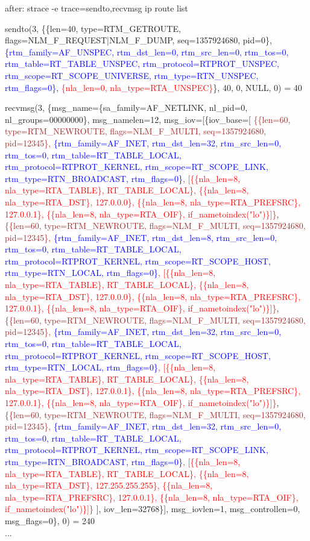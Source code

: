 \documentclass[unicode,aspectratio=169]{beamer}
\begin{document}
\begin{frame}[fragile]{\small after: strace -e trace=sendto,recvmsg ip route list}

{\texttt\tiny
\fontsize{4pt}{4pt}\selectfont
sendto(3, \{\{len=40, type=RTM\_GETROUTE, flags=NLM\_F\_REQUEST|NLM\_F\_DUMP, seq=1357924680, pid=0\},
 \textcolor{blue}{\{rtm\_family=AF\_UNSPEC, rtm\_dst\_len=0, rtm\_src\_len=0, rtm\_tos=0, rtm\_table=RT\_TABLE\_UNSPEC, rtm\_protocol=RTPROT\_UNSPEC, rtm\_scope=RT\_SCOPE\_UNIVERSE, rtm\_type=RTN\_UNSPEC, rtm\_flags=0\}},
  \textcolor{red}{\{nla\_len=0, nla\_type=RTA\_UNSPEC\}}\}, 40, 0, NULL, 0) = 40

\medskip

recvmsg(3, \{msg\_name=\{sa\_family=AF\_NETLINK, nl\_pid=0, nl\_groups=00000000\}, msg\_namelen=12, msg\_iov=[\{iov\_base=[
\textcolor{brown}{\{\{len=60, type=RTM\_NEWROUTE, flags=NLM\_F\_MULTI, seq=1357924680, pid=12345\},
 \textcolor{blue}{\{rtm\_family=AF\_INET, rtm\_dst\_len=32, rtm\_src\_len=0, rtm\_tos=0, rtm\_table=RT\_TABLE\_LOCAL, rtm\_protocol=RTPROT\_KERNEL, rtm\_scope=RT\_SCOPE\_LINK, rtm\_type=RTN\_BROADCAST, rtm\_flags=0\}},
  \textcolor{red}{[\{\{nla\_len=8, nla\_type=RTA\_TABLE\}, RT\_TABLE\_LOCAL\}, \{\{nla\_len=8, nla\_type=RTA\_DST\}, 127.0.0.0\}, \{\{nla\_len=8, nla\_type=RTA\_PREFSRC\}, 127.0.0.1\}, \{\{nla\_len=8, nla\_type=RTA\_OIF\}, if\_nametoindex("lo")\}]}\}},
\textcolor{brown}{\{\{len=60, type=RTM\_NEWROUTE, flags=NLM\_F\_MULTI, seq=1357924680, pid=12345\},
 \textcolor{blue}{\{rtm\_family=AF\_INET, rtm\_dst\_len=8, rtm\_src\_len=0, rtm\_tos=0, rtm\_table=RT\_TABLE\_LOCAL, rtm\_protocol=RTPROT\_KERNEL, rtm\_scope=RT\_SCOPE\_HOST, rtm\_type=RTN\_LOCAL, rtm\_flags=0\}},
  \textcolor{red}{[\{\{nla\_len=8, nla\_type=RTA\_TABLE\}, RT\_TABLE\_LOCAL\}, \{\{nla\_len=8, nla\_type=RTA\_DST\}, 127.0.0.0\}, \{\{nla\_len=8, nla\_type=RTA\_PREFSRC\}, 127.0.0.1\}, \{\{nla\_len=8, nla\_type=RTA\_OIF\}, if\_nametoindex("lo")\}]}\}},
\textcolor{brown}{\{\{len=60, type=RTM\_NEWROUTE, flags=NLM\_F\_MULTI, seq=1357924680, pid=12345\},
 \textcolor{blue}{\{rtm\_family=AF\_INET, rtm\_dst\_len=32, rtm\_src\_len=0, rtm\_tos=0, rtm\_table=RT\_TABLE\_LOCAL, rtm\_protocol=RTPROT\_KERNEL, rtm\_scope=RT\_SCOPE\_HOST, rtm\_type=RTN\_LOCAL, rtm\_flags=0\}},
  \textcolor{red}{[\{\{nla\_len=8, nla\_type=RTA\_TABLE\}, RT\_TABLE\_LOCAL\}, \{\{nla\_len=8, nla\_type=RTA\_DST\}, 127.0.0.1\}, \{\{nla\_len=8, nla\_type=RTA\_PREFSRC\}, 127.0.0.1\}, \{\{nla\_len=8, nla\_type=RTA\_OIF\}, if\_nametoindex("lo")\}]}\}},
\textcolor{brown}{\{\{len=60, type=RTM\_NEWROUTE, flags=NLM\_F\_MULTI, seq=1357924680, pid=12345\},
 \textcolor{blue}{\{rtm\_family=AF\_INET, rtm\_dst\_len=32, rtm\_src\_len=0, rtm\_tos=0, rtm\_table=RT\_TABLE\_LOCAL, rtm\_protocol=RTPROT\_KERNEL, rtm\_scope=RT\_SCOPE\_LINK, rtm\_type=RTN\_BROADCAST, rtm\_flags=0\}},
  \textcolor{red}{[\{\{nla\_len=8, nla\_type=RTA\_TABLE\}, RT\_TABLE\_LOCAL\}, \{\{nla\_len=8, nla\_type=RTA\_DST\}, 127.255.255.255\}, \{\{nla\_len=8, nla\_type=RTA\_PREFSRC\}, 127.0.0.1\}, \{\{nla\_len=8, nla\_type=RTA\_OIF\}, if\_nametoindex("lo")\}]}\}}
], iov\_len=32768\}], msg\_iovlen=1, msg\_controllen=0, msg\_flags=0\}, 0) = 240 \\

...
}
\end{frame}
\end{document}
